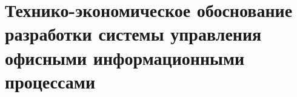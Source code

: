 \section{Технико-экономическое обоснование разработки системы управления офисными информационными процессами}
\label{sec:economics}








